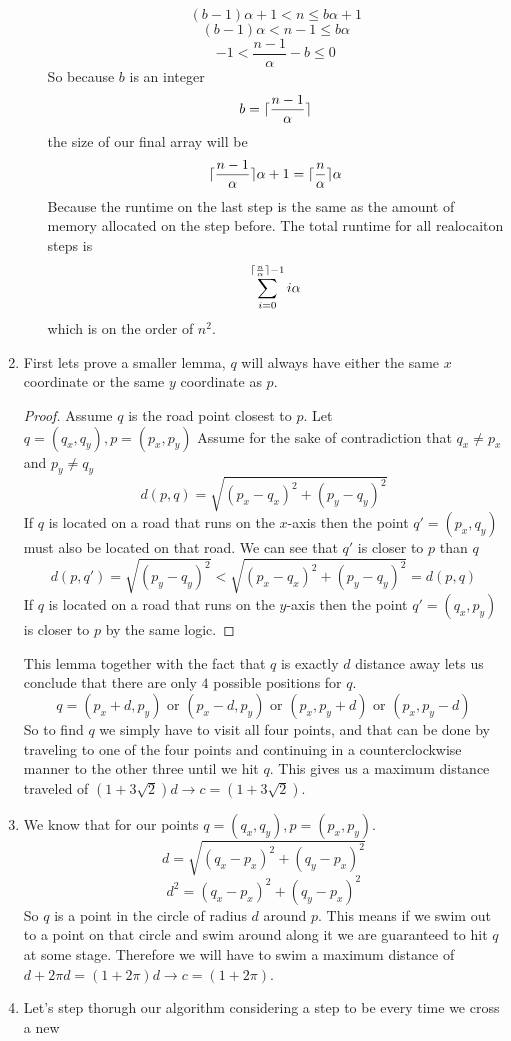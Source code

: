 \documentclass[11pt]{article}
\DeclarePairedDelimiter\ceil{\lceil}{\rceil}
\begin{document}
\begin{enumerate}
\begin{enumerate}
		$$ (b-1)\alpha + 1 < n \leq b\alpha + 1 $$
		$$ (b-1)\alpha < n-1 \leq b\alpha $$
		$$ -1 < \frac{n-1}{\alpha} -b \leq 0 $$
		So because $b$ is an integer
		$$b = \ceil{\frac{n-1}{\alpha}}$$
		the size of our final array will be
		$$ \ceil{\frac{n-1}{\alpha}}\alpha + 1 = \ceil{\frac{n}{\alpha}}\alpha $$ 
		Because the runtime on the last step is the same as the amount
		of memory allocated on the step before.
		The total runtime for all realocaiton steps is
		$$\sum^{\ceil{\frac{n}{\alpha}}-1}_{i=0}i\alpha  $$
		which is on the order of $n^2$.
\end{enumerate}
\item First lets prove a smaller lemma, 
		$q$ will always have either the same $x$
		coordinate or the same $y$ coordinate as $p$.
	\begin{proof}
		Assume $q$ is the road point closest to $p$. Let 
		$q= (q_x,q_y), p=(p_x,p_y)$ 
		Assume for the sake of contradiction that $q_x \neq p_x$ and
		$p_y \neq q_y$
		$$d(p,q) = \sqrt{(p_x-q_x)^2 + (p_y-q_y)^2}$$
		If $q$ is located on a road that runs on the $x$-axis then the point
 $q' = (p_x,q_y)$ must also be located on that road. We can see
		that $q'$ is closer to $p$ than $q$
		$$ d(p,q') = \sqrt{(p_y-q_y)^2} 
		< \sqrt{(p_x-q_x)^2 + (p_y-q_y)^2} = d(p,q) $$
		If $q$ is located on a road that runs on the $y$-axis then the
		point $q' = (q_x, p_y)$ is closer to $p$ by the same logic.
	\end{proof}
	This lemma together with the fact that $q$ is exactly $d$ distance away lets us
	conclude that there are only $4$ possible positions for $q$.
	$$q = (p_x + d, p_y)\text{ or }(p_x - d, p_y) \text{ or }(p_x, p_y + d)\text{ or } (p_x, p_y - d)$$
	So to find $q$ we simply have to visit all four points, and that can be
	done by traveling to one of the four points and continuing in a
	counterclockwise manner to the other three until we hit $q$. This gives
	us a maximum distance traveled of $(1+3\sqrt2)d \rightarrow c =
	(1+3\sqrt2)$.
\item 
	We know that for our points $q = (q_x,q_y),p =(p_x,p_y)$.
	$$d = \sqrt{(q_x-p_x)^2 +(q_y-p_x)^2}$$
	$$d^2 = (q_x-p_x)^2 + (q_y-p_x)^2$$
	So $q$ is a point in the circle of radius $d$ around $p$. This means if we
	swim out to a point on that circle and swim around along it we are
	guaranteed to hit $q$ at some stage. Therefore we will have to swim a
	maximum distance of $d + 2\pi d = (1+2\pi)d \rightarrow c = (1+2\pi)$.
\item
	Let's step thorugh our algorithm considering a step to be every time we cross a new

\end{enumerate}
\end{document}
